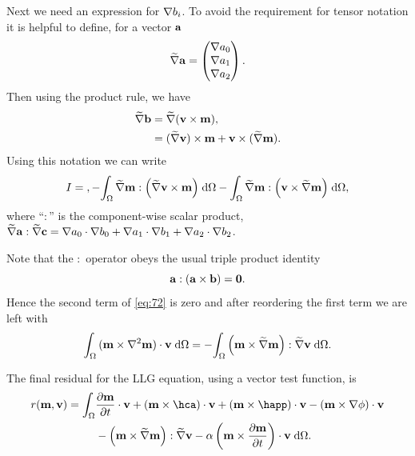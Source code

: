 Next we need an expression for $\nabla b_i$.
To avoid the requirement for tensor notation it is helpful to define, for a vector ${\boldsymbol{\mathrm{a}}}$
\begin{equation}
\widetilde{\nabla} {\boldsymbol{\mathrm{a}}} = \begin{pmatrix} \nabla a_0 \\ \nabla a_1 \\ \nabla a_2 \end{pmatrix}.
\end{equation}
Then using the product rule, we have
\begin{equation}
  \begin{aligned}
    \widetilde{\nabla} {\boldsymbol{\mathrm{b}}} &= \widetilde{\nabla} {\left( \boldsymbol{\mathrm{v}} \times \boldsymbol{\mathrm{m}} \right)}, \\
    & = (\widetilde{\nabla} \boldsymbol{\mathrm{v}}) \times \boldsymbol{\mathrm{m}} + \boldsymbol{\mathrm{v}} \times (\widetilde{\nabla} \boldsymbol{\mathrm{m}}).
  \end{aligned}
\end{equation}
Using this notation we can write
\begin{equation}
  I =  \\,
  - \intd{\gradv \mv : \bigb{\gradv \testv \times \mv}}
      - \intd{\gradv \mv : \bigb{\testv \times \gradv \mv}},
      \label{eq:72}
\end{equation}
where ``$:$'' is the component-wise scalar product, \ie $\widetilde{\nabla} {\boldsymbol{\mathrm{a}}} : \widetilde{\nabla} {\boldsymbol{\mathrm{c}}} = \nabla a_0 \cdot \nabla b_0 + \nabla a_1 \cdot \nabla b_1 + \nabla a_2 \cdot \nabla b_2$.

Note that the $:$ operator obeys the usual triple product identity
\begin{equation}
  \av : (\av \times \bv) = \zerov.
  \label{triple:-identity}
\end{equation}
Hence the second term of \cref{eq:72} is zero and after reordering the first term we are left with
\begin{equation}
  \label{eq:final-lap-residual}
  \intd{ (\mv \times \lap \mv) \cdot \testv } = - \intd{\bigb{\mv \times \gradv \mv} : \gradv \testv}.
\end{equation}

The final residual for the LLG equation, using a vector test function, is
\begin{equation}
  \begin{aligned}
    \label{eq:llg-res-final}
    \rllg(\mv, \testv) = \int_\magd &\dmdt\cdot \testv
    + (\mv \times \hca)\cdot \testv
    + (\mv \times \happ)\cdot \testv
    - (\mv \times \grad \phi)\cdot \testv \\
    & - \bigb{\mv \times \gradv \mv} : \gradv \testv
    - \dampc \left( \mv \times \dmdt \right)\cdot \testv
    \d\magd.
  \end{aligned}
\end{equation}


